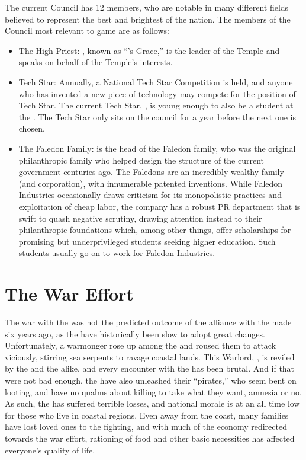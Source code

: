 \documentclass[blue]{GL2020}
\begin{document}
The current Council has 12 members, who are notable in many different fields believed to represent the best and brightest of the nation. The members of the Council most relevant to game are as follows:
\begin{itemize}
    \item The High Priest: \cAntiChup{\full}, known as “\cTechGod{}'s Grace,” is the leader of the Temple and speaks on behalf of the Temple's interests.
    \item Tech Star: Annually, a National Tech Star Competition is held, and anyone who has invented a new piece of technology may compete for the position of Tech Star. The current Tech Star, \cTechStar{\full}, is young enough to also be a student at the \pSchool{}. The Tech Star only sits on the council for a year before the next one is chosen.
    \item The Faledon Family: \cFaledonParent{\full} is the head of the Faledon family, who was the original philanthropic family who helped design the structure of the current government centuries ago. The Faledons are an incredibly wealthy family (and corporation), with innumerable patented inventions. While Faledon Industries occasionally draws criticism for its monopolistic practices and exploitation of cheap labor, the company has a robust PR department that is swift to quash negative scrutiny, drawing attention instead to their philanthropic foundations which, among other things, offer scholarships for promising but underprivileged students seeking higher education. Such students usually go on to work for Faledon Industries.  
\end{itemize}

\section*{The War Effort}
The war with the \pShippies{} was not the predicted outcome of the alliance with the \pFarm{} made six years ago, as the \pShippies{} have historically been slow to adopt great changes. Unfortunately, a warmonger rose up among the \pShippies{} and roused them to attack viciously, stirring sea serpents to ravage coastal lands. This Warlord, \cLoud{\full}, is reviled by the \pTechies{} and the \pFarm{} alike, and every encounter with the \pShippies{} has been brutal. And if that were not bad enough, the \pShippies{} have also unleashed their ``pirates,'' who seem bent on looting, and have no qualms about killing to take what they want, amnesia or no. As such, the \pTech{} has suffered terrible losses, and national morale is at an all time low for those who live in coastal regions. Even away from the coast, many families have lost loved ones to the fighting, and with much of the economy redirected towards the war effort, rationing of food and other basic necessities has affected everyone's quality of life.
\end{document}
